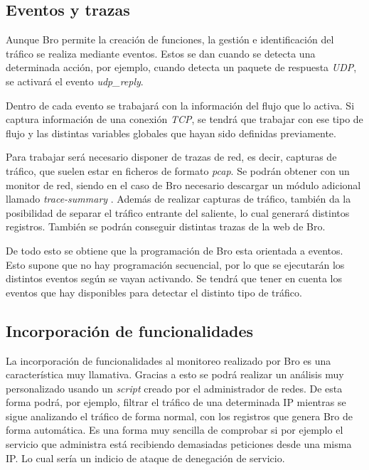 \subsection{Eventos y trazas}

Aunque Bro permite la creación de funciones, la gestión e identificación del tráfico se realiza mediante eventos. Estos se dan cuando 
se detecta una determinada acción, por ejemplo, cuando detecta un paquete de respuesta \textit{UDP}, se activará el evento \textit{udp\_reply}.

\intro Dentro de cada evento se trabajará con la información del flujo que lo activa. Si captura información de una conexión 
\textit{TCP}, se tendrá que trabajar con ese tipo de flujo y las distintas variables globales que hayan sido definidas previamente.

\intro Para trabajar será necesario disponer de trazas de red, es decir, capturas de tráfico, que suelen estar en ficheros de formato 
\textit{pcap}. Se podrán obtener con un monitor de red, siendo en el caso de Bro necesario descargar un módulo adicional llamado 
\textit{trace-summary} \cite{brotrace}. Además de realizar capturas de tráfico, también da la posibilidad de separar el tráfico 
entrante del saliente, lo cual generará distintos registros. También se podrán conseguir distintas trazas de la web de Bro.

\intro De todo esto se obtiene que la programación de Bro esta orientada a eventos. Esto supone que no hay programación secuencial, 
por lo que se ejecutarán los distintos eventos según se vayan activando. Se tendrá que tener en cuenta los eventos que hay disponibles 
para detectar el distinto tipo de tráfico.

\subsection{Incorporación de funcionalidades}

La incorporación de funcionalidades al monitoreo realizado por Bro es una característica muy llamativa. Gracias 
a esto se podrá realizar un análisis muy personalizado usando un \textit{script} creado por el administrador de redes. De 
esta forma podrá, por ejemplo, filtrar el tráfico de una determinada IP mientras se sigue analizando el tráfico 
de forma normal, con los registros que genera Bro de forma automática. Es una forma muy sencilla de comprobar 
si por ejemplo el servicio que administra está recibiendo demasiadas peticiones desde una misma IP. Lo cual 
sería un indicio de ataque de denegación de servicio.

